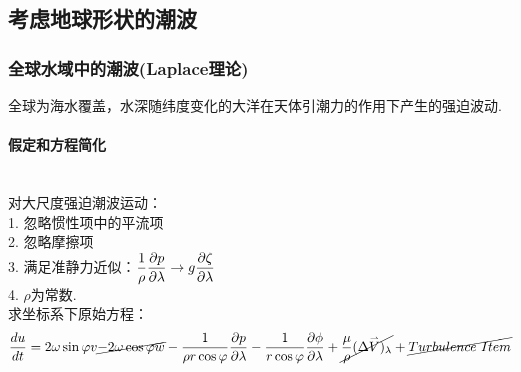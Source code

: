 \documentclass[a4paper,12pt]{article}
\begin{document}
    \subsection{考虑地球形状的潮波}
    \subsubsection{全球水域中的潮波(Laplace理论)}
    全球为海水覆盖，水深随纬度变化的大洋在天体引潮力的作用下产生的强迫波动.
    \paragraph{假定和方程简化}~{}\\
    对大尺度强迫潮波运动： \\
    1. 忽略惯性项中的平流项\\
    2. 忽略摩擦项\\
    3. 满足准静力近似：$\displaystyle {1 \over \rho }{{\partial p} \over {\partial \lambda }} \to g{{\partial \zeta } \over {\partial \lambda }}$\\
    4. $\rho$为常数.\\
    求坐标系下原始方程：
    \[
        {{du} \over {dt}} = 2\omega \sin \varphi v \cancel{- 2\omega \cos \varphi w }- {1 \over {\rho r\cos \varphi }}{{\partial p} \over {\partial \lambda }} - {1 \over {r\cos \varphi }}{{\partial \phi } \over {\partial \lambda }} + \cancel{{\mu  \over \rho }{(\Delta \mathord{\buildrel{\lower3pt\hbox{$\scriptscriptstyle\rightharpoonup$}}\over 
V} )_\lambda }} + \cancel{Turbulence\ Item}
    \]
\end{document}
